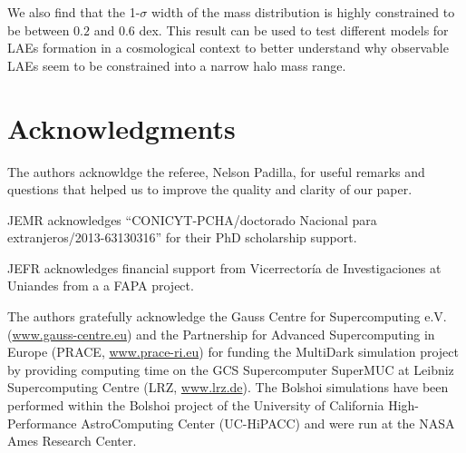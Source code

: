 \documentclass{emulateapj}
\begin{document}
We also find that the 1-$\sigma$ width of the mass distribution is
highly constrained to be between $0.2$ and $0.6$ dex. 
This result can be used to test different models for LAEs formation
in a cosmological context to better understand why observable LAEs seem to be
constrained into a narrow halo mass range.


 




\section*{Acknowledgments} 

The authors acknowldge the referee, Nelson Padilla, for useful
remarks and questions that helped us to improve the quality and
clarity of our paper. 

JEMR acknowledges ``CONICYT-PCHA/doctorado Nacional para
extranjeros/2013-63130316'' for their PhD scholarship support.  

JEFR acknowledges financial support from Vicerrector\'ia de
Investigaciones at Uniandes from a a FAPA project.

The authors gratefully acknowledge the Gauss Centre for Supercomputing
e.V. (\url{www.gauss-centre.eu}) and the Partnership for Advanced
Supercomputing in Europe (PRACE, \url{www.prace-ri.eu}) for funding the
MultiDark simulation project by providing computing time on the GCS
Supercomputer SuperMUC at Leibniz Supercomputing Centre (LRZ,
\url{www.lrz.de}). The Bolshoi simulations have been performed within the
Bolshoi project of the University of California High-Performance
AstroComputing Center (UC-HiPACC) and were run at the NASA Ames
Research Center. 
\end{document}
